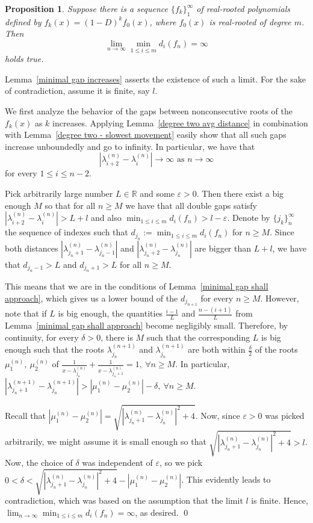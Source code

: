 \documentclass[11pt]{article}
\newtheorem{proposition}[theorem]{Proposition}
\begin{document}
\begin{proposition}
\label{minimal gap is unbounded}
Suppose there is a sequence $\{f_k\}_1^\infty$ of real-rooted polynomials defined by $f_k(x) = (1-D)^k f_0(x)$, where $f_0(x)$ is real-rooted of degree $m$. Then
\[\lim_{n\to\infty} \min_{1\leq i \leq m} d_i (f_n) = \infty\]
holds true.
\end{proposition}
\proof Lemma~\ref{minimal gap increases} asserts the existence of such a limit. For the sake of contradiction, assume it is finite, say $l$.

We first analyze the behavior of the gaps between nonconsecutive roots of the $f_k(x)$ as $k$ increases. Applying Lemma~\ref{degree two avg distance} in combination with Lemma~\ref{degree two - slowest movement} easily show that all such gaps increase unboundedly and go to infinity. In particular, we have that
\[|\lambda^{(n)}_{i+2} - \lambda^{(n)}_i|\to \infty\text{~as~$n\to\infty$}\]
for every $1\leq i \leq n-2$.

Pick arbitrarily large number $L\in\mathbb{R}$ and some $\varepsilon > 0$. Then there exist a big enough $M$ so that for all $n\geq M$ we have that all double gaps satisfy $|\lambda^{(n)}_{i+2} - \lambda^{(n)}_i| > L + l$ and also $\min_{1\leq i \leq m} d_i (f_n)> l - \varepsilon$. Denote by $\{j_k\}_{n}^{\infty}$ the sequence of indexes such that $d_{j_n}:=\min_{1\leq i \leq m} d_i (f_n)$ for $n\geq M$. Since both distances $|\lambda^{(n)}_{j_n+1} - \lambda^{(n)}_{j_n-1}|$ and $|\lambda^{(n)}_{j_n+2} - \lambda^{(n)}_{j_n}|$ are bigger than $L + l$, we have that $d_{j_n-1}> L$ and $d_{j_n+1} > L$ for all $n\geq M$. 

This means that we are in the conditions of Lemma~\ref{minimal gap shall approach}, which gives us a lower bound of the $d_{j_{n+1}}$ for every $n\geq M$. However, note that if $L$ is big enough, the quantities $\frac{i-1}{L}$ and $\frac{n-(i+1)}{L}$ from Lemma~\ref{minimal gap shall approach} become negligibly small. Therefore, by continuity, for every $\delta > 0$, there is $M$ such that the corresponding $L$ is big enough such that the roots $\lambda^{(n+1)}_{j_n}$ and $\lambda^{(n+1)}_{j_n}$ are both within $\frac{\delta}{2}$ of the roots $\mu^{(n)}_1,~\mu^{(n)}_2$ of $\frac{1}{x-\lambda^{(n)}_{j_n}} + \frac{1}{x-\lambda^{(n)}_{j_n+1}} = 1,~\forall n\geq M$. In particular, $|\lambda^{(n+1)}_{j_n+1} - \lambda^{(n+1)}_{j_n}|>|\mu^{(n)}_1 - \mu^{(n)}_2| - \delta,~\forall n\geq M$.

Recall that $|\mu^{(n)}_1 - \mu^{(n)}_2|= \sqrt{|\lambda^{(n)}_{j_n+1} - \lambda^{(n)}_{j_n}|^2 + 4}$. Now, since $\varepsilon > 0$ was picked arbitrarily, we might assume it is small enough so that $\sqrt{|\lambda^{(n)}_{j_n+1} - \lambda^{(n)}_{j_n}|^2 + 4} > l$. Now, the choice of $\delta$ was independent of $\varepsilon$, so we pick $0< \delta <\sqrt{|\lambda^{(n)}_{j_n+1} - \lambda^{(n)}_{j_n}|^2 + 4} - |\mu^{(n)}_1 - \mu^{(n)}_2|$. This evidently leads to contradiction, which was based on the assumption that the limit $l$ is finite. Hence, $\lim_{n\to\infty} \min_{1\leq i \leq m} d_i (f_n) = \infty$, as desired. \qed
\end{document}
